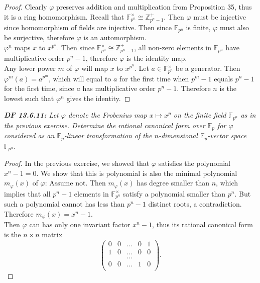 \documentclass{article}
\begin{document}
  \begin{proof}
    Clearly $\varphi$ preserves addition and multiplication from
    Proposition 35, thus it is a ring homomorphism.
    Recall that $\mathbb{F}_{p^n}^\times \cong\mathbb{Z}_{p^n-1}^+$.
    Then $\varphi$ must be injective since homomorphism of fields are
    injective. Then since $\mathbb{F}_{p^n}$ is finite, $\varphi$ must also
    be surjective, therefore $\varphi$ is an automorphism. \\

    $\varphi^n$ maps $x$ to $x^{p^n}$. Then since $\mathbb{F}_{p^n}^\times
    \cong\mathbb{Z}_{p^n-1}^+$, all non-zero elements in $\mathbb{F}_{p^n}$
    have multiplicative order $p^n-1$, therefore $\varphi$ is the identity
    map. \\

    Any lower power $m$ of $\varphi$ will map $x$ to $x^{p^n}$. Let
    $a\in\mathbb{F}_{p^n}^\times$ be a generator. Then
    $\varphi^m(a)=a^{p^m}$, which will equal to $a$ for the first time when
    $p^m-1$ equals $p^n-1$ for the first time, since $a$ has multiplicative
    order $p^n-1$. Therefore $n$ is the lowest such that $\varphi^n$ gives
    the identity. 
  \end{proof}

\it \textbf{DF 13.6.11:} Let $\varphi$ denote the Frobenius map $x\mapsto
  x^p$ on the finite field $\mathbb{F}_{p^n}$ as in the previous exercise.
  Determine the rational canonical form over $\mathbb{F}_p$ for $\varphi$
  considered as an $\mathbb{F}_p$-linear transformation of the
  $n$-dimensional $\mathbb{F}_p$-vector space $\mathbb{F}_{p^n}$.

  \begin{proof}
    In the previous exercise, we showed that $\varphi$ satisfies the
    polynomial $x^n-1=0$. We show that this is polynomial is also the
    minimal polynomial $m_\varphi(x)$ of $\varphi$: Assume not. Then
    $m_\varphi(x)$ has degree smaller than $n$, which implies that
    all $p^n-1$ elements in $\mathbb{F}_{p^n}^\times$ satisfy a polynomial
    smaller than $p^n$. But such a polynomial cannot has less than $p^n-1$
    distinct roots, a contradiction. Therefore $m_\varphi(x)=x^n-1$. \\

    Then $\varphi$ can has only one invariant factor $x^n-1$, thus its
    rational canonical form is the $n\times n$ matrix
    \[\begin{pmatrix}
      0&0&\ldots&0&1\\
      1&0&\ldots&0&0\\
       & &\ldots& & \\
      0&0&\ldots&1&0\\
    \end{pmatrix}.\]
  \end{proof}
\end{document}
